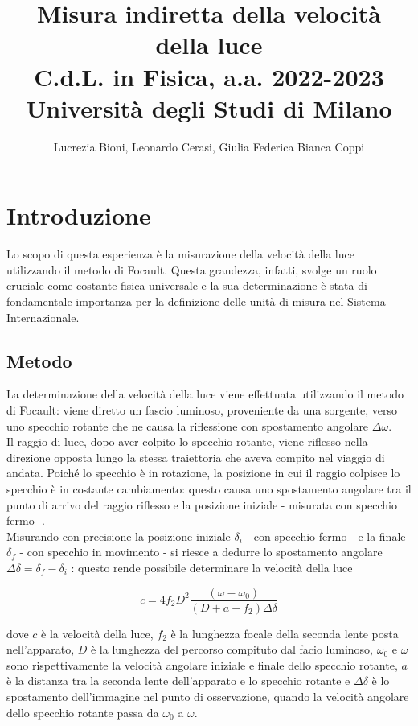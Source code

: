 \documentclass[]{article}
\title{%
    \Huge Misura indiretta della velocità della luce \\
    \Large C.d.L. in Fisica, a.a. 2022-2023 \\ Università degli Studi di Milano}
\author{\LARGE Lucrezia Bioni, Leonardo Cerasi, Giulia Federica Bianca Coppi}
\date{}
\let\oldsection\section%
\renewcommand{\section}{%
	\renewcommand{\theequation}{\thesection.\arabic{equation}}%
	\oldsection}%
\let\oldsubsection\subsection%
\renewcommand{\subsection}{%
	\renewcommand{\theequation}{\thesubsection.\arabic{equation}}%
	\oldsubsection}%
\begin{document}
    \maketitle

    \section{Introduzione}

    Lo scopo di questa esperienza è la misurazione della velocità della luce utilizzando 
    il metodo di Focault. Questa grandezza, infatti, svolge un ruolo cruciale come costante 
    fisica universale e la sua determinazione è stata di fondamentale importanza per la definizione 
    delle unità di misura nel Sistema Internazionale.

    \subsection{Metodo}
    
    La determinazione della velocità della luce viene effettuata utilizzando il metodo di Focault: 
    viene diretto un fascio luminoso, proveniente da una sorgente, verso uno specchio rotante che ne causa
     la riflessione con spostamento angolare $    \Delta\omega  $.\\
     Il raggio di luce, dopo aver colpito lo specchio rotante, viene riflesso nella direzione opposta lungo 
     la stessa traiettoria che aveva compito nel viaggio di andata. Poiché lo specchio è in rotazione, 
     la posizione in cui il raggio colpisce lo specchio è in costante cambiamento: questo causa uno spostamento
      angolare tra il punto di arrivo del raggio riflesso e la posizione iniziale - misurata con specchio fermo -.\\
      Misurando con precisione la posizione iniziale $ \delta _i $ - con specchio fermo - e la finale  $ \delta _f $ - con specchio in movimento - 
      si riesce a dedurre lo spostamento angolare $ \Delta \delta = \delta_f - \delta_i $ : questo rende possibile determinare la velocità della luce 

    \begin{equation}
    \label{eqn:c}
    c=4f_2D^2
    \frac{(\omega -\omega_0)}{(D+a-f_2)\Delta \delta }
    \end{equation}

    dove $ c $ è la velocità della luce, $ f_2 $ è la lunghezza focale della seconda lente posta nell'apparato,
    $ D $ è la lunghezza del percorso compituto dal facio luminoso, $ \omega_0 $ e $ \omega $ sono rispettivamente
    la velocità angolare iniziale e finale dello specchio rotante, $ a $ è la distanza tra 
    la seconda lente dell'apparato e lo specchio rotante e $ \Delta\delta$ è lo spostamento 
    dell'immagine nel punto di osservazione, quando la velocità angolare dello specchio rotante passa da 
    $ \omega_0 $ a $ \omega $.
\end{document}
